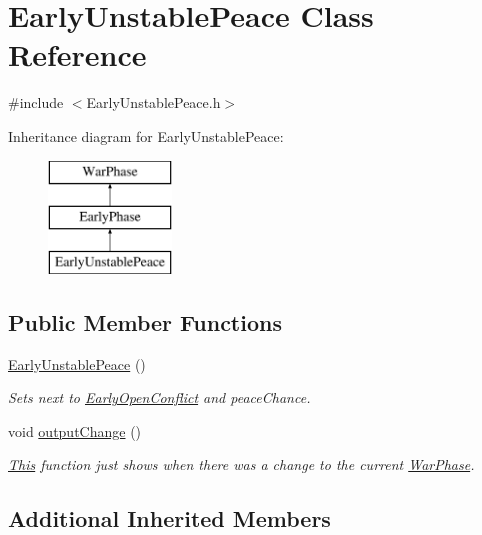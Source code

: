 \hypertarget{class_early_unstable_peace}{}\section{Early\+Unstable\+Peace Class Reference}
\label{class_early_unstable_peace}


{\ttfamily \#include $<$Early\+Unstable\+Peace.\+h$>$}

Inheritance diagram for Early\+Unstable\+Peace\+:\begin{figure}[H]
\begin{center}
\leavevmode
\includegraphics[height=3.000000cm]{class_early_unstable_peace}
\end{center}
\end{figure}
\subsection*{Public Member Functions}
\begin{DoxyCompactItemize}
\item 
\mbox{\hyperlink{class_early_unstable_peace_a18e6e1d0cd2fbad582706ab00b888fbf}{Early\+Unstable\+Peace}} ()
\begin{DoxyCompactList}\small\item\em Sets next to \mbox{\hyperlink{class_early_open_conflict}{Early\+Open\+Conflict}} and peace\+Chance. \end{DoxyCompactList}\item 
void \mbox{\hyperlink{class_early_unstable_peace_ab48c4136bd2efb74c74c537f697bfd0c}{output\+Change}} ()
\begin{DoxyCompactList}\small\item\em \mbox{\hyperlink{class_this}{This}} function just shows when there was a change to the current \mbox{\hyperlink{class_war_phase}{War\+Phase}}. \end{DoxyCompactList}\end{DoxyCompactItemize}
\subsection*{Additional Inherited Members}


